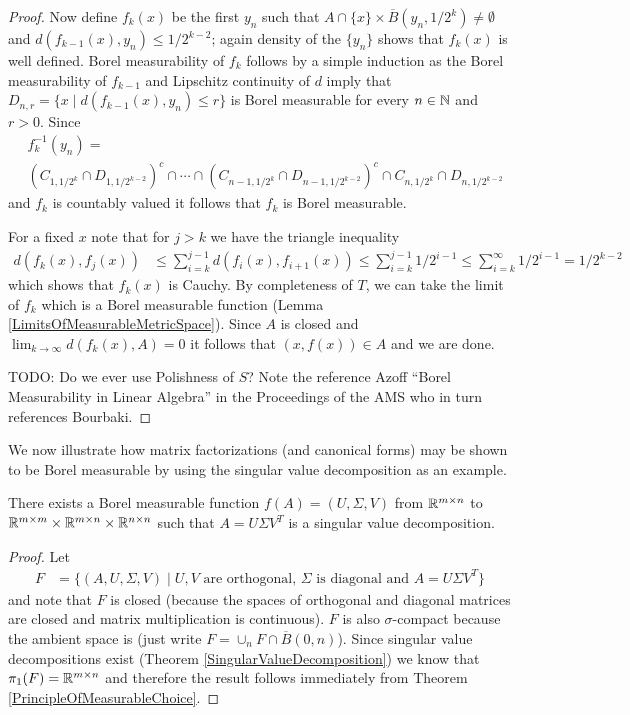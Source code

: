 \begin{proof}
Now define $f_k(x)$ be the first $y_n$ such that $A \cap \lbrace x \rbrace \times \overline{B}(y_n, 1/2^k) \neq \emptyset$ and $d(f_{k-1}(x), y_n) \leq 1/2^{k-2}$; again density of the $\lbrace y_n \rbrace$ shows that $f_k(x)$ is well defined.  Borel measurability of $f_k$ follows by a simple induction as the Borel measurability of $f_{k-1}$ and Lipschitz continuity of $d$ imply that $D_{n,r} = \lbrace x \mid d(f_{k-1}(x), y_n) \leq r \rbrace$ is Borel measurable for every $n \in \mathbb{N}$ and $r > 0$.  Since 
\begin{align*}
&f_k^{-1}(y_n) = \\
&(C_{1,1/2^k} \cap D_{1, 1/2^{k-2}})^c \cap \dotsb \cap (C_{n-1,1/2^k} \cap D_{n-1, 1/2^{k-2}})^c \cap  C_{n,1/2^k} \cap D_{n, 1/2^{k-2}}
\end{align*}
and $f_k$ is countably valued it follows that $f_k$ is Borel measurable.

For a fixed $x$ note that for $j > k$ we have the triangle inequality
\begin{align*}
d(f_k(x), f_j(x)) &\leq \sum_{i=k}^{j-1} d(f_i(x), f_{i+1}(x)) \leq \sum_{i=k}^{j-1} 1/2^{i-1} \leq \sum_{i=k}^\infty 1/2^{i-1} = 1/2^{k-2}
\end{align*}
which shows that $f_k(x)$ is Cauchy.  By completeness of $T$, we can take 
the limit of $f_k$ which is a Borel measurable function (Lemma \ref{LimitsOfMeasurableMetricSpace}).  Since $A$ is closed and $\lim_{k \to \infty} d(f_k(x), A) = 0$ it follows that $(x,f(x)) \in A$ and we are done.

TODO: Do we ever use Polishness of $S$?  Note the reference Azoff ``Borel Measurability in Linear Algebra'' in the Proceedings of the AMS who in turn references Bourbaki.
\end{proof}

We now illustrate how matrix factorizations (and canonical forms) may be shown to be Borel measurable by using the singular value decomposition as an example.  
\begin{cor}\label{BorelMeasurabilitySVD}There exists a Borel measurable function $f (A) = (U,\Sigma,V)$ from  $\mathbb{R}^{m\times n}$ to $\mathbb{R}^{m \times m} \times \mathbb{R}^{m \times n} \times \mathbb{R}^{n \times n}$ such that $A = U \Sigma V^T$ is a singular value decomposition.
\end{cor}
\begin{proof}
Let 
\begin{align*}
F &= \lbrace (A, U,\Sigma, V) \mid \text{$U, V$ are orthogonal, $\Sigma$ is diagonal and $A = U \Sigma V^T$} \rbrace
\end{align*}
and note that $F$ is closed (because the spaces of orthogonal and diagonal matrices are closed and matrix multiplication is continuous).  $F$ is also $\sigma$-compact because the ambient space is (just write $F = \cup_n F \cap \overline{B}(0,n)$).  Since singular value decompositions exist (Theorem \ref{SingularValueDecomposition}) we know that $\pi_1(F) = \mathbb{R}^{m \times n}$ and therefore the result follows immediately from Theorem \ref{PrincipleOfMeasurableChoice}.
\end{proof}

